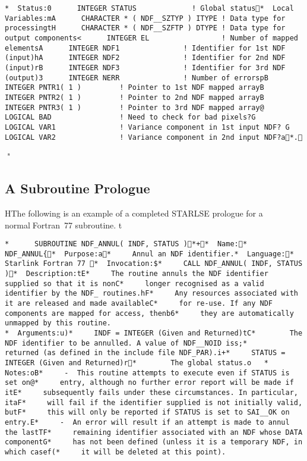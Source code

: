 {\begin{verbatim}
 *  Status:0       INTEGER STATUS             ! Global status   *  Local Variables:mA       CHARACTER * ( NDF__SZTYP ) ITYPE ! Data type for processingtH       CHARACTER * ( NDF__SZFTP ) DTYPE ! Data type for output components<       INTEGER EL                 ! Number of mapped elementsA       INTEGER NDF1               ! Identifier for 1st NDF (input)hA       INTEGER NDF2               ! Identifier for 2nd NDF (input)rB       INTEGER NDF3               ! Identifier for 3rd NDF (output)3       INTEGER NERR               ! Number of errorspB       INTEGER PNTR1( 1 )         ! Pointer to 1st NDF mapped arrayB       INTEGER PNTR2( 1 )         ! Pointer to 2nd NDF mapped arrayB       INTEGER PNTR3( 1 )         ! Pointer to 3rd NDF mapped array@       LOGICAL BAD                ! Need to check for bad pixels?G       LOGICAL VAR1               ! Variance component in 1st input NDF? G       LOGICAL VAR2               ! Variance component in 2nd input NDF?a   *. \end{verbatim} \normalsizeh  " \subsection{A Subroutine Prologue}  H The following is an example of a completed STARLSE prologue for a normal Fortran~77 subroutine. t   \small \begin{verbatim}*       SUBROUTINE NDF_ANNUL( INDF, STATUS ) *+ *  Name: *     NDF_ANNUL{   *  Purpose:a *     Annul an NDF identifier.   *  Language: *     Starlink Fortran 77    *  Invocation:$ *     CALL NDF_ANNUL( INDF, STATUS )   *  Description:tE *     The routine annuls the NDF identifier supplied so that it is nonC *     longer recognised as a valid identifier by the NDF_ routines.hF *     Any resources associated with it are released and made availableC *     for re-use. If any NDF components are mapped for access, thenb6 *     they are automatically unmapped by this routine.  
 *  Arguments:u) *     INDF = INTEGER (Given and Returned)tC *        The NDF identifier to be annulled. A value of NDF__NOID iss; *        returned (as defined in the include file NDF_PAR).i+ *     STATUS = INTEGER (Given and Returned)r *        The global status.o  	 *  Notes:oB *     -  This routine attempts to execute even if STATUS is set on@ *     entry, although no further error report will be made if itE *     subsequently fails under these circumstances. In particular, itaF *     will fail if the identifier supplied is not initially valid, butF *     this will only be reported if STATUS is set to SAI__OK on entry.E *     -  An error will result if an attempt is made to annul the lastTF *     remaining identifier associated with an NDF whose DATA componentG *     has not been defined (unless it is a temporary NDF, in which casef( *     it will be deleted at this point).  

\end{verbatim}}
